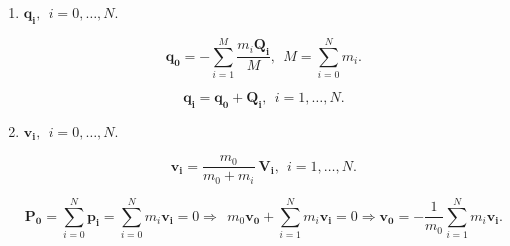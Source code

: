 \begin{enumerate}

\item $\mathbf{q_i}, \ \ i=0,\dots,N$. 

\begin{equation*}
\mathbf{q_0}=-\sum\limits_{i=1}^{M} \frac{m_i \mathbf{Q_i}}{M}, \ \ M= \sum\limits_{i=0}^{N} m_i.
\end{equation*} 

\begin{equation*}
\mathbf{q_i}=\mathbf{q_0}+\mathbf{Q_i}, \ \ i=1,\dots,N.
\end{equation*}

\item $\mathbf{v_i}, \ \ i=0,\dots,N$. 

\begin{equation*}
\mathbf{v_i}=\frac{m_0}{m_0+m_i} \ \mathbf{V_i}, \ \ i=1,\dots,N.
\end{equation*}

\begin{equation*}
\mathbf{P_0}=\sum\limits_{i=0}^{N} \mathbf{p_i}=\sum\limits_{i=0}^{N} m_i \mathbf{v_i}=0 \Rightarrow \ \  m_0\mathbf{v_0}+ \sum\limits_{i=1}^{N} m_i \mathbf{v_i}=0 \Rightarrow \mathbf{v_0}=-\frac{1}{m_0} \sum\limits_{i=1}^{N} m_i \mathbf{v_i}. 
\end{equation*}

\end{enumerate}





 
